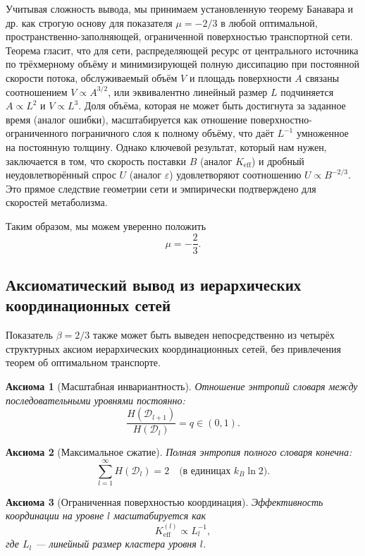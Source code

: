 \documentclass[11pt,a4paper]{article}
\newtheorem{axiom}{Аксиома}[section]
\begin{document}
	Учитывая сложность вывода, мы принимаем установленную теорему Банавара и др. как строгую основу для показателя \(\mu = -2/3\) в любой оптимальной, пространственно-заполняющей, ограниченной поверхностью транспортной сети. Теорема гласит, что для сети, распределяющей ресурс от центрального источника по трёхмерному объёму и минимизирующей полную диссипацию при постоянной скорости потока, обслуживаемый объём \(V\) и площадь поверхности \(A\) связаны соотношением \(V \propto A^{3/2}\), или эквивалентно линейный размер \(L\) подчиняется \(A \propto L^2\) и \(V \propto L^3\). Доля объёма, которая не может быть достигнута за заданное время (аналог ошибки), масштабируется как отношение поверхностно-ограниченного пограничного слоя к полному объёму, что даёт \(L^{-1}\) умноженное на постоянную толщину. Однако ключевой результат, который нам нужен, заключается в том, что скорость поставки \(B\) (аналог \(K_{\mathrm{eff}}\)) и дробный неудовлетворённый спрос \(U\) (аналог \(\varepsilon\)) удовлетворяют соотношению \(U \propto B^{-2/3}\). Это прямое следствие геометрии сети и эмпирически подтверждено для скоростей метаболизма.
	
	Таким образом, мы можем уверенно положить
	\[
	\mu = -\frac{2}{3}. \label{eq:mu}
	\]
	
	\subsection{Аксиоматический вывод из иерархических координационных сетей}
	\label{subsec:axiomatic-beta}
	
	Показатель \(\beta = 2/3\) также может быть выведен непосредственно из четырёх структурных аксиом иерархических координационных сетей, без привлечения теорем об оптимальном транспорте.
	
	\begin{axiom}[Масштабная инвариантность]
		\label{ax:A1}
		Отношение энтропий словаря между последовательными уровнями постоянно:
		\[
		\frac{H(\mathcal{D}_{l+1})}{H(\mathcal{D}_l)} = q \in (0,1).
		\]
	\end{axiom}
	
	\begin{axiom}[Максимальное сжатие]
		\label{ax:A2}
		Полная энтропия полного словаря конечна:
		\[
		\sum_{l=1}^{\infty} H(\mathcal{D}_l) = 2 \quad \text{(в единицах } k_B\ln 2).
		\]
	\end{axiom}
	
	\begin{axiom}[Ограниченная поверхностью координация]
		\label{ax:A3}
		Эффективность координации на уровне \(l\) масштабируется как
		\[
		K_{\mathrm{eff}}^{(l)} \propto L_l^{-1},
		\]
		где \(L_l\) — линейный размер кластера уровня \(l\).
	\end{axiom}
	
\end{document}
